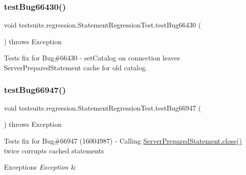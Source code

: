 \subsubsection{\texorpdfstring{test\+Bug66430()}{testBug66430()}}
{\footnotesize\ttfamily void testsuite.\+regression.\+Statement\+Regression\+Test.\+test\+Bug66430 (\begin{DoxyParamCaption}{ }\end{DoxyParamCaption}) throws Exception}

Tests fix for Bug\#66430 -\/ set\+Catalog on connection leaves Server\+Prepared\+Statement cache for old catalog. \mbox{\label{classtestsuite_1_1regression_1_1_statement_regression_test_a222cfacd79b9dcf61c6ebefe3966ede7}} 
\subsubsection{\texorpdfstring{test\+Bug66947()}{testBug66947()}}
{\footnotesize\ttfamily void testsuite.\+regression.\+Statement\+Regression\+Test.\+test\+Bug66947 (\begin{DoxyParamCaption}{ }\end{DoxyParamCaption}) throws Exception}

Tests fix for Bug\#66947 (16004987) -\/ Calling \mbox{\hyperlink{classcom_1_1mysql_1_1cj_1_1jdbc_1_1_server_prepared_statement_abc26fe33d6a4b5ae00f85a355b6b7171}{Server\+Prepared\+Statement.\+close()}} twice corrupts cached statements


\begin{DoxyExceptions}{Exceptions}
{\em Exception} & \\
\hline
\end{DoxyExceptions}
\mbox{\label{classtestsuite_1_1regression_1_1_statement_regression_test_a56e71fb8ad060f98fe506bef810726c9}} 
